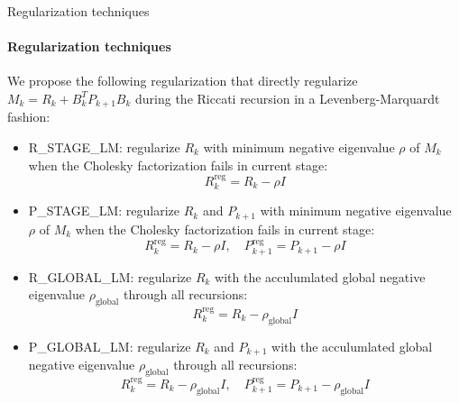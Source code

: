 \documentclass[10pt,aspectratio=1610]{beamer} %
\begin{document}
\begin{frame}{Regularization techniques}
    \framesubtitle{Regularization techniques}
	We propose the following regularization that directly regularize $M_k=R_k + B_k^T P_{k+1} B_k$ during the Riccati recursion in a Levenberg-Marquardt fashion:
	\begin{itemize}
		\item R\_STAGE\_LM: regularize $R_k$ with minimum negative eigenvalue $\rho$ of $M_k$ when the Cholesky factorization fails in current stage:
		\begin{equation*}
			R_k^{\text{reg}} = R_k - \rho I
		\end{equation*}
		\item P\_STAGE\_LM:	regularize $R_k$ and $P_{k+1}$ with minimum negative eigenvalue $\rho$ of $M_k$ when the Cholesky factorization fails in current stage:
		\begin{equation*}
			R_k^{\text{reg}} = R_k - \rho I  , \quad P_{k+1}^{\text{reg}} = P_{k+1} - \rho I
		\end{equation*}
		\item R\_GLOBAL\_LM: regularize $R_k$ with the acculumlated global negative eigenvalue $\rho_{\text{global}}$ through all recursions:
		\begin{equation*}
			R_k^{\text{reg}} = R_k - \rho_{\text{global}} I
		\end{equation*}
		\item P\_GLOBAL\_LM: regularize $R_k$ and $P_{k+1}$ with the acculumlated global negative eigenvalue $\rho_{\text{global}}$ through all recursions:
		\begin{equation*}
			R_k^{\text{reg}} = R_k - \rho_{\text{global}} I  , \quad P_{k+1}^{\text{reg}} = P_{k+1} - \rho_{\text{global}} I
		\end{equation*}
	\end{itemize}
\end{frame}
\end{document}
